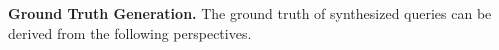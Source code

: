   
  

\noindent \textbf{Ground Truth Generation.} 
The  ground truth of synthesized queries can be derived from  the following perspectives.


